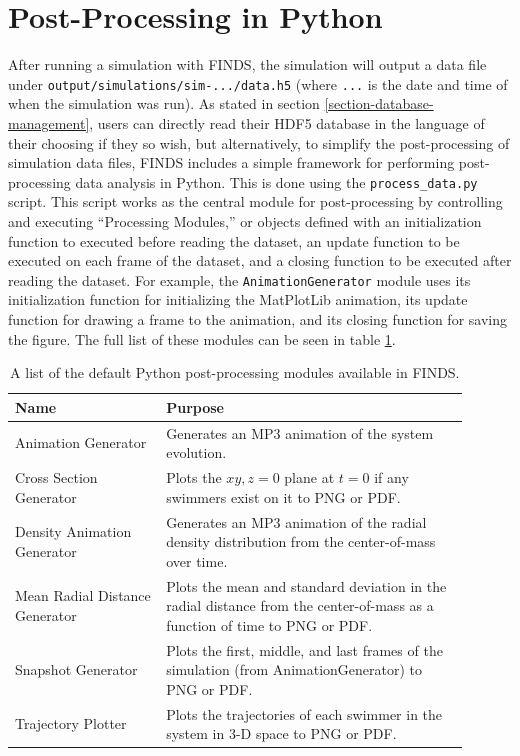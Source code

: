 \documentclass[letterpaper, 10pt, twoside]{LTJournalArticle}
\begin{document}
\section{Post-Processing in Python}
\label{section-post-processing}

After running a simulation with FINDS, the simulation will output a data file
under \texttt{output/simulations/sim-.../data.h5} (where \texttt{...} is the
date and time of when the simulation was run). As stated in section
\ref{section-database-management}, users can directly read their HDF5 database
in the language of their choosing if they so wish, but alternatively, to
simplify the post-processing of simulation data files, FINDS includes a simple
framework for performing post-processing data analysis in Python. This is done
using the \texttt{process\_data.py} script. This script works as the central
module for post-processing by controlling and executing ``Processing Modules,''
or objects defined with an initialization function to executed before reading
the dataset, an update function to be executed on each frame of the dataset,
and a closing function to be executed after reading the dataset. For example,
the \texttt{AnimationGenerator} module uses its initialization function for
initializing the MatPlotLib animation, its update function for drawing a frame
to the animation, and its closing function for saving the figure. The full list
of these modules can be seen in table \ref{tbl-post-processing-modules}.

\begin{table}[htbp]
  \centering
  \begin{tabular}{p{0.3\linewidth}p{0.6\linewidth}}
    \textbf{Name} & \textbf{Purpose} \\ \hline
    Animation Generator &
    Generates an MP3 animation of the system evolution. \\

    Cross Section Generator &
    Plots the $xy, z=0$ plane at $t=0$ if any swimmers exist on it to PNG or
    PDF. \\

    Density Animation Generator &
    Generates an MP3 animation of the radial density distribution from the
    center-of-mass over time. \\

    Mean Radial Distance Generator &
    Plots the mean and standard deviation in the radial distance from the
    center-of-mass as a function of time to PNG or PDF. \\

    Snapshot Generator &
    Plots the first, middle, and last frames of the simulation (from
    AnimationGenerator) to PNG or PDF. \\

    Trajectory Plotter &
    Plots the trajectories of each swimmer in the system in 3-D space to PNG
    or PDF.
  \end{tabular}
  \caption{A list of the default Python post-processing modules available in
    FINDS.}
  \label{tbl-post-processing-modules}
\end{table}
\end{document}
